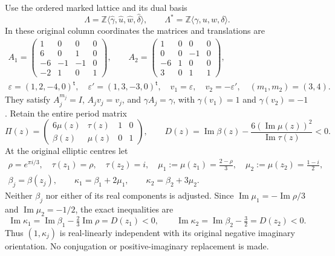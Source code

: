 Use the ordered marked lattice and its dual basis
\[
 \Lambda=\mathbb Z\langle\widehat\gamma,\widehat u,
            \widehat w,\widehat\delta\rangle,
 \qquad \Lambda^*=\mathbb Z\langle\gamma,u,w,\delta\rangle.
 \tag{FF1}\label{wb:ffcert:eq:marking}
\]
In these original column coordinates the matrices and translations are
\[
\begin{gathered}
 A_1=\begin{pmatrix}1&0&0&0\\6&0&1&0\\-6&-1&-1&0\\-2&1&0&1\end{pmatrix},
 \qquad
 A_2=\begin{pmatrix}1&0&0&0\\0&0&-1&0\\-6&1&0&0\\3&0&1&1\end{pmatrix},\\
 \varepsilon=(1,2,-4,0)^{\mathsf t},\quad
 \varepsilon'=(1,3,-3,0)^{\mathsf t},\quad
 v_1=\varepsilon,\quad v_2=-\varepsilon',\quad (m_1,m_2)=(3,4).
\end{gathered}
\tag{FF2}\label{wb:ffcert:eq:matrices-translations}
\]
They satisfy $A_j^{m_j}=I$, $A_jv_j=v_j$, and
$\gamma A_j=\gamma$, with $\gamma(v_1)=1$ and $\gamma(v_2)=-1$.
Retain the entire period matrix
\[
 \Pi(z)=\begin{pmatrix}6\mu(z)&\tau(z)&1&0\\
                         \beta(z)&\mu(z)&0&1\end{pmatrix},
 \qquad
 D(z)=\operatorname{Im}\beta(z)
       -\frac{6(\operatorname{Im}\mu(z))^2}{\operatorname{Im}\tau(z)}<0.
 \tag{FF3}\label{wb:ffcert:eq:periods}
\]
At the original elliptic centres let
\[
\begin{gathered}
 \rho=e^{\pi i/3},\quad \tau(z_1)=\rho,\quad \tau(z_2)=i,
 \quad \mu_1:=\mu(z_1)=\frac{2-\rho}{3},\quad
 \mu_2:=\mu(z_2)=\frac{1-i}{2},\\
 \beta_j=\beta(z_j),\qquad
 \kappa_1=\beta_1+2\mu_1,\qquad
 \kappa_2=\beta_2+3\mu_2.
\end{gathered}
\tag{FF4}\label{wb:ffcert:eq:central-parameters}
\]
Neither $\beta_j$ nor either of its real components is adjusted.
Since $\operatorname{Im}\mu_1=-\operatorname{Im}\rho/3$ and
$\operatorname{Im}\mu_2=-1/2$, the exact inequalities are
\[
 \operatorname{Im}\kappa_1
 =\operatorname{Im}\beta_1-\tfrac23\operatorname{Im}\rho=D(z_1)<0,
 \qquad
 \operatorname{Im}\kappa_2
 =\operatorname{Im}\beta_2-\tfrac32=D(z_2)<0.
 \tag{FF5}\label{wb:ffcert:eq:negative-orientation}
\]
Thus $(1,\kappa_j)$ is real-linearly independent with its original
negative imaginary orientation. No conjugation or positive-imaginary
replacement is made.

